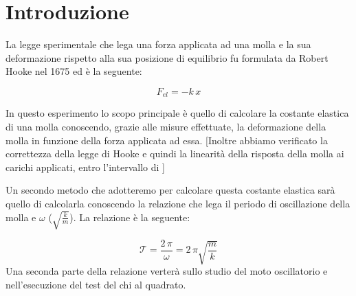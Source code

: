 \section{Introduzione}
La legge sperimentale che lega una forza applicata ad una molla e la sua deformazione rispetto alla sua posizione di equilibrio fu formulata da Robert Hooke nel 1675 ed è la seguente:

\begin{equation}
	F_{el} = -k\,x
	\label{hooke}
\end{equation}

In questo esperimento lo scopo principale è quello di calcolare la costante elastica di una molla conoscendo, grazie alle misure effettuate, la deformazione della molla in funzione della forza applicata ad essa. [Inoltre abbiamo verificato la correttezza della legge di Hooke e quindi la linearità della risposta della molla ai carichi applicati, entro l'intervallo di ]

Un secondo metodo che adotteremo per calcolare questa costante elastica sarà quello di calcolarla conoscendo la relazione che lega il periodo di oscillazione della molla e $\omega$ ($\sqrt{\frac{k}{m}}$). La relazione è la seguente:

\begin{equation}
	\mathcal{T} = \frac{2\,\pi}{\omega} = {2\,\pi}{\sqrt{\frac{m}{k}}}
\end{equation}
%
Una seconda parte della relazione verterà sullo studio del moto oscillatorio e nell'esecuzione del test del chi al quadrato.
